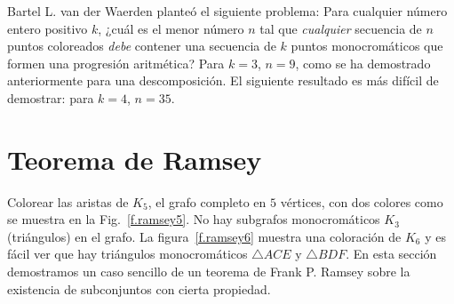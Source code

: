 Bartel L. van der Waerden planteó el siguiente problema: Para cualquier número entero positivo $k$, ¿cuál es el menor número $n$ tal que \emph{cualquier} secuencia de $n$ puntos coloreados \emph{debe} contener una secuencia de $k$ puntos monocromáticos que formen una progresión aritmética? Para $k=3$, $n=9$, como se ha demostrado anteriormente para una descomposición. El siguiente resultado es más difícil de demostrar: para $k=4$, $n=35$.


\section{Teorema de Ramsey}\label{s.ramsey}

Colorear las aristas de $K_5$, el grafo completo en $5$ vértices, con dos colores como se muestra en la Fig.~\ref{f.ramsey5}. No hay subgrafos monocromáticos $K_3$ (triángulos) en el grafo. La figura~\ref{f.ramsey6} muestra una coloración de $K_6$ y es fácil ver que hay triángulos monocromáticos $\triangle ACE$ y $\triangle BDF$. En esta sección demostramos un caso sencillo de un teorema de Frank P. Ramsey sobre la existencia de subconjuntos con cierta propiedad.
